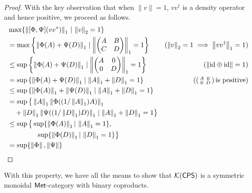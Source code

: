 \begin{proof}
  With the key observation that when \(\|v\| = 1\), \(vv^\dagger\) is a density operator \cite[Eq.~2.12]{watrous2018theory} and hence positive, we proceed as follows.
\begin{equation*}
\begin{split}
         &\max \{ \left\lVert [\Phi,\Psi] (vv^*) \right\rVert_{1} \, | \, \left\lVert v \right\rVert_{2}=1\} \\
        & =
        \max \left \{ \left\lVert \Phi(A) + \Psi(D) \right\rVert_1 \mid 
                \left \lVert
                      \begin{pmatrix}
                              A & B
                              \\
                              C & D
                      \end{pmatrix}
                \right \rVert_1 = 1 
        \right \} & (\left\lVert v \right\rVert_{2}=1 \implies \left\lVert vv^\dag \right\rVert_{1}=1 )
        \\
        & \leq
        \sup \left \{ \left\lVert \Phi(A) + \Psi(D) \right\rVert_1 \mid 
                \left \lVert
                      \begin{pmatrix}
                              A & 0
                              \\
                              0 & D
                      \end{pmatrix}
                \right \rVert_1 = 1 
        \right \}
        & ( \text{$\left\lVert \mathrm{id} \oplus \mathrm{id} \right\rVert = 1$} )
        \\
        & =
        \sup \left \{ \left\lVert \Phi(A) + \Psi(D) \right\rVert_1 \mid 
                \left\lVert A \right\rVert_1 + \left\lVert D \right\rVert_1 = 1
        \right \}
        &  
         \left(\left(\begin{smallmatrix}
    A & 0 \\
    0 & D
  \end{smallmatrix}\right) \text{is positive} \right)
        \\
        & \leq
        \sup \left \{ \left\lVert \Phi(A) \right\rVert_1 + \left\lVert \Psi(D) \right\rVert_1 \mid 
                \left\lVert A \right\rVert_1 + \left\lVert D \right\rVert_1 = 1
        \right \}
        & 
        \\
        & =
        \sup \big \{ \left\lVert A \right\rVert_1\left\lVert \Phi((1/ \left\lVert A \right\rVert_1) A) \right\rVert_1 \\
        & \hspace{10pt}+ 
                \left\lVert D \right\rVert_1\left\lVert \Psi((1 / \left\lVert D \right\rVert_1)D) \right\rVert_1 \mid 
                \left\lVert A \right\rVert_1 + \left\lVert D \right\rVert_1 = 1
        \big \}
        & 
        \\
        & \leq
        \sup \big \{ \sup \{ \left\lVert \Phi(A) \right\rVert_1 | \,  \left\lVert A \right\rVert_1 = 1  \},  \\
        & \hspace{42pt}
                \sup \{ \left\lVert \Phi(D) \right\rVert_1 | \,  \left\lVert D \right\rVert_1 = 1 \}
        \big \}
        & 
        \\
        &
        = \sup \{ \left\lVert \Phi \right\rVert,\left\lVert \Psi \right\rVert \} 
\end{split}
\end{equation*}
\end{proof}
With this property, we have all the means to show that $\mathcal{K}{(\mathsf{CPS})}$ is a symmetric monoidal $\mathsf{Met}$-category with binary coproducts.


